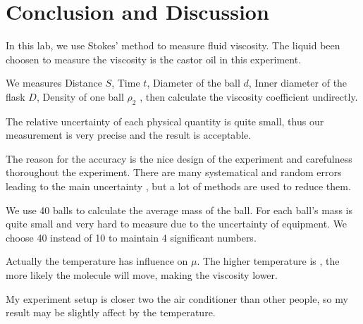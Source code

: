 \section{Conclusion and Discussion}

In this lab, we use Stokes’ method to measure fluid viscosity.
The liquid been choosen to measure the viscosity is  the castor oil in this
experiment.

We measures Distance $S$, Time $t$, Diameter of the ball $d$, Inner diameter of
the flask $D$, Density of one ball $\rho_2$ , then calculate the viscosity
coefficient undirectly.

The relative uncertainty of each physical quantity is quite small, thus our
measurement is very precise and the result is acceptable.

The reason for the accuracy is the nice design of the experiment and carefulness
thoroughout the experiment.
There are many systematical and random errors leading to the main uncertainty ,
but a lot of methods are used to reduce them.

We use 40 balls to calculate the average mass of the ball.
For each ball's mass is quite small and very hard to measure due to the uncertainty of equipment.
We choose 40 instead of 10 to maintain 4 significant numbers.

Actually the temperature has influence on $\mu$.
The higher temperature is , the more likely the molecule will move, making the
viscosity lower. 

My experiment setup is closer two the air conditioner than other people, so my
result may be slightly affect by the temperature. 



